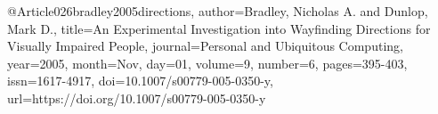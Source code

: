 @Article{026bradley2005directions,
author={Bradley, Nicholas A.
and Dunlop, Mark D.},
title={An Experimental Investigation into Wayfinding Directions for Visually Impaired People},
journal={Personal and Ubiquitous Computing},
year={2005},
month={Nov},
day={01},
volume={9},
number={6},
pages={395-403},
issn={1617-4917},
doi={10.1007/s00779-005-0350-y},
url={https://doi.org/10.1007/s00779-005-0350-y}
}